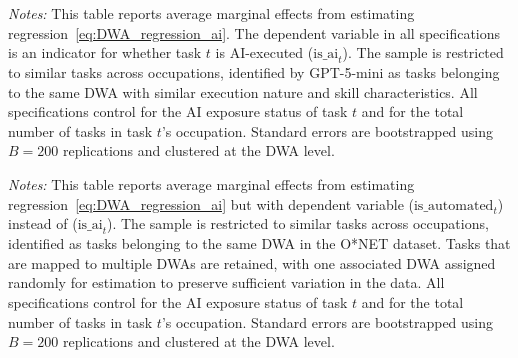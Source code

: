 \newpage
\begin{table}[ht!]
\begin{center}
\caption{Effect of Neighboring Tasks' AI Execution Status on Task's AI Execution Likelihood (GPT-filtered Sample)}
\label{tab:DWA_regression_aiExecution_GPTsample}
\resizebox{\textwidth}{!}{

}
\end{center}
\footnotesize{\emph{Notes:}} 
This table reports average marginal effects from estimating regression~\eqref{eq:DWA_regression_ai}.  
The dependent variable in all specifications is an indicator for whether task $t$ is AI-executed ($\text{is\_ai}_{t}$).  
The sample is restricted to similar tasks across occupations, identified by GPT-5-mini as tasks belonging to the same DWA with similar execution nature and skill characteristics.  
All specifications control for the AI exposure status of task $t$ and for the total number of tasks in task $t$'s occupation.
Standard errors are bootstrapped using $B=200$ replications and clustered at the DWA level.  
\end{table}




\newpage
\begin{table}[ht!]
\begin{center}
\caption{Effect of Neighboring Tasks' AI Execution Status on Task's AI Automation Likelihood}
\label{tab:DWA_regression_aiAutomation_mainSample}
\resizebox{\textwidth}{!}{

}
\end{center}
\footnotesize{\emph{Notes:}} 
This table reports average marginal effects from estimating regression~\eqref{eq:DWA_regression_ai} but with dependent variable ($\text{is\_automated}_{t}$) instead of ($\text{is\_ai}_{t}$).  
The sample is restricted to similar tasks across occupations, identified as tasks belonging to the same DWA in the O*NET dataset.  
Tasks that are mapped to multiple DWAs are retained, with one associated DWA assigned randomly for estimation to preserve sufficient variation in the data.  
All specifications control for the AI exposure status of task $t$ and for the total number of tasks in task $t$’s occupation.  
Standard errors are bootstrapped using $B=200$ replications and clustered at the DWA level.  
\end{table}





